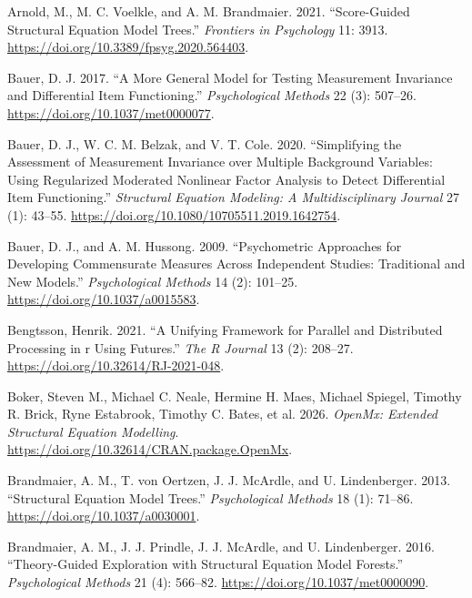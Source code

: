 \documentclass[
  man,
  floatsintext]{apa7}
\newlength{\cslhangindent}
\newenvironment{CSLReferences}[2] %
 {\begin{list}{}{%
  \setlength{\itemindent}{0pt}
  \setlength{\leftmargin}{0pt}
  \setlength{\parsep}{0pt}
  \ifodd #1
   \setlength{\leftmargin}{\cslhangindent}
   \setlength{\itemindent}{-1\cslhangindent}
  \fi
  \setlength{\itemsep}{#2\baselineskip}}}
 {\end{list}}
\begin{document}
\label{refs}
\begin{CSLReferences}{1}{0}
Arnold, M., M. C. Voelkle, and A. M. Brandmaier. 2021. {``Score-Guided
Structural Equation Model Trees.''} \emph{Frontiers in Psychology} 11:
3913. \url{https://doi.org/10.3389/fpsyg.2020.564403}.

Bauer, D. J. 2017. {``A More General Model for Testing Measurement
Invariance and Differential Item Functioning.''} \emph{Psychological
Methods} 22 (3): 507--26. \url{https://doi.org/10.1037/met0000077}.

Bauer, D. J., W. C. M. Belzak, and V. T. Cole. 2020. {``Simplifying the
Assessment of Measurement Invariance over Multiple Background Variables:
Using Regularized Moderated Nonlinear Factor Analysis to Detect
Differential Item Functioning.''} \emph{Structural Equation Modeling: A
Multidisciplinary Journal} 27 (1): 43--55.
\url{https://doi.org/10.1080/10705511.2019.1642754}.

Bauer, D. J., and A. M. Hussong. 2009. {``Psychometric Approaches for
Developing Commensurate Measures Across Independent Studies: Traditional
and New Models.''} \emph{Psychological Methods} 14 (2): 101--25.
\url{https://doi.org/10.1037/a0015583}.

Bengtsson, Henrik. 2021. {``A Unifying Framework for Parallel and
Distributed Processing in r Using Futures.''} \emph{The R Journal} 13
(2): 208--27. \url{https://doi.org/10.32614/RJ-2021-048}.

Boker, Steven M., Michael C. Neale, Hermine H. Maes, Michael Spiegel,
Timothy R. Brick, Ryne Estabrook, Timothy C. Bates, et al. 2026.
\emph{OpenMx: Extended Structural Equation Modelling}.
\url{https://doi.org/10.32614/CRAN.package.OpenMx}.

Brandmaier, A. M., T. von Oertzen, J. J. McArdle, and U. Lindenberger.
2013. {``Structural Equation Model Trees.''} \emph{Psychological
Methods} 18 (1): 71--86. \url{https://doi.org/10.1037/a0030001}.

Brandmaier, A. M., J. J. Prindle, J. J. McArdle, and U. Lindenberger.
2016. {``Theory-Guided Exploration with Structural Equation Model
Forests.''} \emph{Psychological Methods} 21 (4): 566--82.
\url{https://doi.org/10.1037/met0000090}.


\end{CSLReferences}
\end{document}
